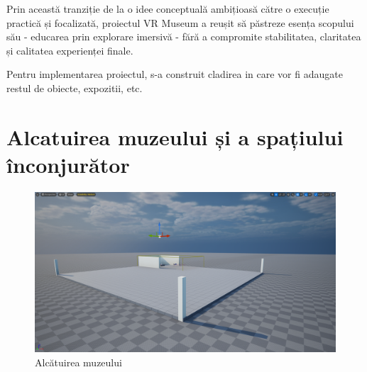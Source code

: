 Prin această tranziție de la o idee conceptuală ambițioasă către o execuție practică și focalizată, proiectul VR Museum a reușit să păstreze esența scopului său - educarea prin explorare imersivă - fără a compromite stabilitatea, claritatea și calitatea experienței finale.

Pentru implementarea proiectul, s-a construit cladirea in care vor fi adaugate restul de obiecte, expozitii, etc.

\section{Alcatuirea muzeului și a spațiului înconjurător}

\begin{figure} [htp] 
\centering 
\includegraphics [width=12cm]
{continut/capitol3/figuri/beginning.png} 
\caption{Alcătuirea muzeului} 
\label{fig:Museum} 
\end{figure}

